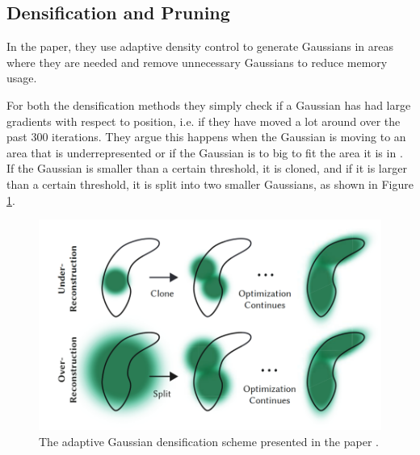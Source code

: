 \subsection{Densification and Pruning}
In the paper, they use adaptive density control to generate Gaussians in areas where they are needed and remove unnecessary Gaussians to reduce memory usage.

For both the densification methods they simply check if a Gaussian has had large gradients with respect to position, i.e. if they have moved a lot around over the past 300 iterations.
They argue this happens when the Gaussian is moving to an area that is underrepresented or if the Gaussian is to big to fit the area it is in \cite[Sec 5.2]{kerbl3DGaussianSplatting2023}.
If the Gaussian is smaller than a certain threshold, it is cloned, and if it is larger than a certain threshold, it is split into two smaller Gaussians, as shown in Figure \ref{fig:densification}.

\begin{figure}
    \centering
    \includegraphics[width=\linewidth]{images/densification.png}
    \caption{The adaptive Gaussian densification scheme presented in the paper \cite[Fig. 4]{kerbl3DGaussianSplatting2023}.}
    \label{fig:densification}
\end{figure}
